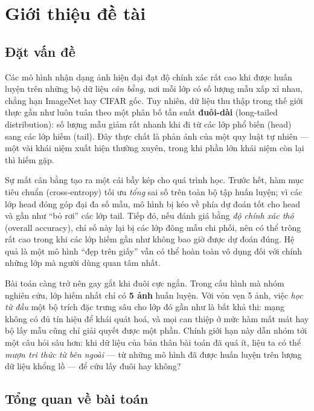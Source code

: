 \chapter{Giới thiệu đề tài}
\label{chap:intro}

\section{Đặt vấn đề}

Các mô hình nhận dạng ảnh hiện đại đạt độ chính xác rất cao khi được huấn luyện trên những bộ dữ
liệu \emph{cân bằng}, nơi mỗi lớp có số lượng mẫu xấp xỉ nhau, chẳng hạn ImageNet hay CIFAR gốc. Tuy
nhiên, dữ liệu thu thập trong thế giới thực gần như luôn tuân theo một phân bố tần suất
\textbf{đuôi-dài} (long-tailed distribution): số lượng mẫu giảm rất nhanh khi đi từ các lớp phổ biến
(head) sang các lớp hiếm (tail). Đây thực chất là phản ánh của một quy luật tự nhiên --- một vài
khái niệm xuất hiện thường xuyên, trong khi phần lớn khái niệm còn lại thì hiếm gặp.

Sự mất cân bằng tạo ra một cái bẫy kép cho quá trình học. Trước hết, hàm mục tiêu chuẩn
(cross-entropy) tối ưu \emph{tổng} sai số trên toàn bộ tập huấn luyện; vì các lớp head đóng góp đại
đa số mẫu, mô hình bị kéo về phía dự đoán tốt cho head và gần như ``bỏ rơi'' các lớp tail. Tiếp đó,
nếu đánh giá bằng \emph{độ chính xác thô} (overall accuracy), chỉ số này lại bị các lớp đông mẫu chi
phối, nên có thể trông rất cao trong khi các lớp hiếm gần như không bao giờ được dự đoán đúng. Hệ
quả là một mô hình ``đẹp trên giấy'' vẫn có thể hoàn toàn vô dụng đối với chính những lớp mà người
dùng quan tâm nhất.

Bài toán càng trở nên gay gắt khi đuôi cực ngắn. Trong cấu hình mà nhóm nghiên cứu, lớp hiếm nhất
chỉ có \textbf{5 ảnh} huấn luyện. Với vỏn vẹn 5 ảnh, việc \emph{học từ đầu} một bộ trích đặc trưng
sâu cho lớp đó gần như là bất khả thi: mạng không có đủ tín hiệu để khái quát hoá, và mọi can thiệp
ở mức hàm mất mát hay bộ lấy mẫu cũng chỉ giải quyết được một phần. Chính giới hạn này dẫn nhóm tới
một câu hỏi sâu hơn: khi dữ liệu của bản thân bài toán đã quá ít, liệu ta có thể \emph{mượn tri thức
từ bên ngoài} --- từ những mô hình đã được huấn luyện trên lượng dữ liệu khổng lồ --- để cứu lấy
đuôi hay không?

\section{Tổng quan về bài toán}

